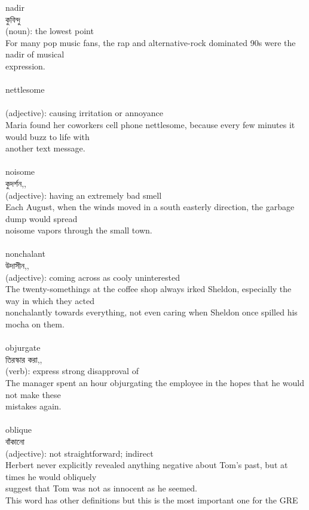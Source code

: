 \documentclass{article}
\begin{document}
{{nadir}\\
{কুবিন্দু}\\
{(noun): the lowest point\\For many pop music fans, the rap and alternative-rock dominated 90s were the nadir of musical\\expression.\\}\\
{nettlesome}\\
{}\\
{(adjective): causing irritation or annoyance\\Maria found her coworkers cell phone nettlesome, because every few minutes it would buzz to life with\\another text message.\\}\\
{noisome}\\
{কুদর্শন,,}\\
{(adjective): having an extremely bad smell\\Each August, when the winds moved in a south easterly direction, the garbage dump would spread\\noisome vapors through the small town.\\}\\
{nonchalant}\\
{উদাসীন,,}\\
{(adjective): coming across as cooly uninterested\\The twenty-somethings at the coffee shop always irked Sheldon, especially the way in which they acted\\nonchalantly towards everything, not even caring when Sheldon once spilled his mocha on them.\\}\\
{objurgate}\\
{তিরস্কার করা,,}\\
{(verb): express strong disapproval of\\The manager spent an hour objurgating the employee in the hopes that he would not make these\\mistakes again.\\}\\
{oblique}\\
{বাঁকানো}\\
{(adjective): not straightforward; indirect\\Herbert never explicitly revealed anything negative about Tom's past, but at times he would obliquely\\suggest that Tom was not as innocent as he seemed.\\This word has other definitions but this is the most important one for the GRE\\\\                                                                                 \\}\\
}
\end{document}
